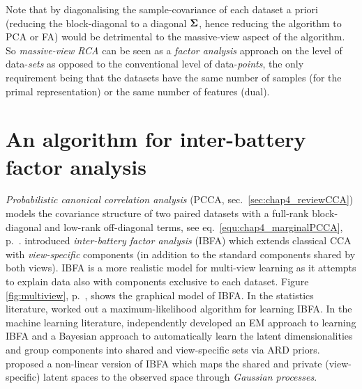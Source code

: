 	Note that by diagonalising the sample-covariance of each dataset a priori (reducing the block-diagonal to a diagonal $\mathbf{\Sigma}$, hence reducing the algorithm to PCA or FA) would be detrimental to the massive-view aspect of the algorithm. So \textit{massive-view RCA} can be seen as a \textit{factor analysis} approach on the level of data-\emph{sets} as opposed to the conventional level of data-\emph{points}, the only requirement being that the datasets have the same number of samples (for the primal representation) or the same number of features (dual).




  \section{An algorithm for inter-battery factor analysis} \label{sec:chap4_IBFA_viaRCA}
    
      \textit{Probabilistic canonical correlation analysis} (PCCA, sec.~\ref{sec:chap4_reviewCCA}) models the covariance structure of two paired datasets with a full-rank block-diagonal and low-rank off-diagonal terms, see eq.~\eqref{equ:chap4_marginalPCCA}, p.~\pageref{equ:chap4_marginalPCCA}.
      \citet{Tucker:interbattery58} introduced \textit{inter-battery factor analysis} (IBFA) which extends classical CCA with \textit{view-specific} components (in addition to the standard components shared by both views).
      IBFA is a more realistic model for multi-view learning as it attempts to explain data also with components exclusive to each dataset.
      Figure \ref{fig:multiview}, p.~\pageref{fig:multiview}, shows the graphical model of IBFA.
      In the statistics literature, \citet{Browne:maximum79} worked out a maximum-likelihood algorithm for learning IBFA.
      In the machine learning literature, \citet{Klami:dependencies08,Klami:generative06} independently developed an EM approach to learning IBFA and a Bayesian approach to automatically learn the latent dimensionalities \citep{Klami:local07} and group components into shared and view-specific sets \citep{Virtanen:bcca11} via ARD priors.
      \citet{Ek:ambiguity08} proposed a non-linear version of IBFA which maps the shared and private (view-specific) latent spaces to the observed space through \textit{Gaussian processes}.
      
